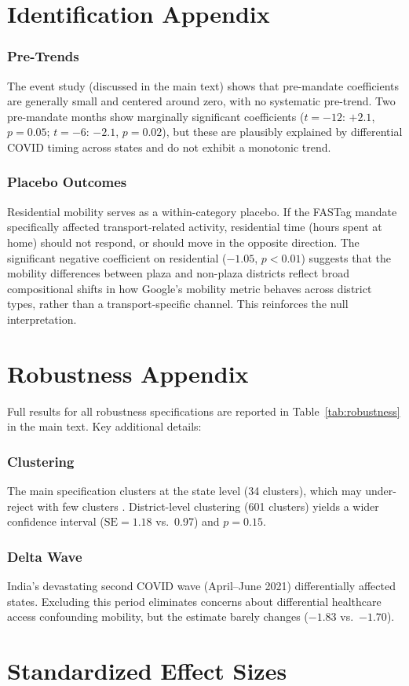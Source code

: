 \documentclass[12pt]{article}
\begin{document}
\section{Identification Appendix}

\subsubsection*{Pre-Trends} The event study (discussed in the main text) shows that pre-mandate coefficients are generally small and centered around zero, with no systematic pre-trend. Two pre-mandate months show marginally significant coefficients ($t = -12$: $+2.1$, $p = 0.05$; $t = -6$: $-2.1$, $p = 0.02$), but these are plausibly explained by differential COVID timing across states and do not exhibit a monotonic trend.

\subsubsection*{Placebo Outcomes} Residential mobility serves as a within-category placebo. If the FASTag mandate specifically affected transport-related activity, residential time (hours spent at home) should not respond, or should move in the opposite direction. The significant negative coefficient on residential ($-1.05$, $p < 0.01$) suggests that the mobility differences between plaza and non-plaza districts reflect broad compositional shifts in how Google's mobility metric behaves across district types, rather than a transport-specific channel. This reinforces the null interpretation.

\section{Robustness Appendix}

Full results for all robustness specifications are reported in Table~\ref{tab:robustness} in the main text. Key additional details:

\subsubsection*{Clustering} The main specification clusters at the state level (34 clusters), which may under-reject with few clusters \citep{cameron2008bootstrap}. District-level clustering (601 clusters) yields a wider confidence interval ($\text{SE} = 1.18$ vs.\ 0.97) and $p = 0.15$.

\subsubsection*{Delta Wave} India's devastating second COVID wave (April--June 2021) differentially affected states. Excluding this period eliminates concerns about differential healthcare access confounding mobility, but the estimate barely changes ($-1.83$ vs.\ $-1.70$).

\section{Standardized Effect Sizes}
\label{sec:sde}


\end{document}
